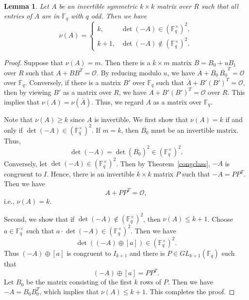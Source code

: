 \documentclass{article}
\newtheorem{lemma}[theorem]{Lemma}
\theoremstyle{definition}
\theoremstyle{remark}
\begin{document}
\begin{lemma}\label{nuinv}
    Let $A$ be an invertible symmetric $k\times k$ matrix over $R$ such that all entries of $A$ are in $\mathbb{F}_q$ with $q$ odd. Then we have
    \[
    \nu(A)=\begin{cases}
        k, &\det(-A)\in (\mathbb{F}_q^\times)^2,\\
        k+1, & \det(-A)\notin (\mathbb{F}_q^\times)^2.
    \end{cases}
    \]
\end{lemma}
\begin{proof}
    Suppose that $\nu(A)=m$. Then there is a $k\times m$ matrix $B=B_0+uB_1$ over $R$ such that $A+BB^T=\mathcal{O}$. By reducing modulo $u$, we have $\overline{A}+\overline{B_0}\,\overline{B_0}^T=\mathcal{O}$ over $\mathbb{F}_q$. Conversely, if there is a matrix $B'$ over $\mathbb{F}_q$ such that $\overline{A}+B'(B')^T=\mathcal{O}$, then by viewing $B'$ as a matrix over $R$, we have $A+B'(B')^T=\mathcal{O}$ over $R$. This implies that $\nu(A)=\nu(\overline{A})$. Thus, we regard $A$ as a matrix over $\mathbb{F}_q$.

    Note that $\nu(A)\ge k$ since $A$ is invertible. We first show that $\nu(A)=k$ if and only if $\det(-A)\in (\mathbb{F}_q^\times)^2$. If $m=k$, then $\overline{B_0}$ must be an invertible matrix. Thus,
    \[
    \det (-A)=\det(\overline{B_0})^2\in (\mathbb{F}_q^\times)^2.
    \]
    Conversely, let $\det(-A)\in (\mathbb{F}_q^\times)^2$. Then by Theorem~\ref{congclass}, $-A$ is congruent to $I$. Hence, there is an invertible $k\times k$ matrix $P$ such that $-A=PP^T$. Then we have
    \[
    A+PP^T=\mathcal{O},
    \]
    i.e., $\nu(A)=k$.

    Second, we show that if $\det(-A)\notin (\mathbb{F}_q^\times)^2$, then $\nu(A)\le k+1$. Choose $a\in \mathbb{F}_q^\times$ such that $a\cdot\det(-A)\in (\mathbb{F}_q^\times)^2$. Then we have
    \[
    \det((-A)\oplus [a])\in (\mathbb{F}_q^\times)^2.
    \]
    Thus $(-A)\oplus [a]$ is congruent to $I_{k+1}$ and there is $P\in GL_{k+1}(\mathbb{F}_q)$ such that
    \[
    (-A)\oplus[a]=PP^T.
    \]
    Let $B_0$ be the matrix consisting of the first $k$ rows of $P$. Then we have $-A=B_0B_0^T$, which implies that $\nu(A)\le k+1$. This completes the proof.
\end{proof}
\end{document}
